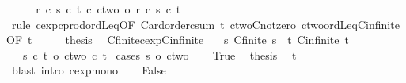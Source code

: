 \begin{isabellebody}
\ \ \isamarkupfalse%
\ \isamarkupfalse%
\ {\isachardoublequoteopen}{\isacharparenleft}{\kern0pt}{\isacharparenleft}{\kern0pt}r\ {\isacharplus}{\kern0pt}c\ s{\isacharparenright}{\kern0pt}\ {\isacharcircum}{\kern0pt}c\ t{\isacharparenright}{\kern0pt}\ {\isacharcircum}{\kern0pt}c\ ctwo\ {\isacharequal}{\kern0pt}o\ {\isacharparenleft}{\kern0pt}r\ {\isacharplus}{\kern0pt}c\ s{\isacharparenright}{\kern0pt}\ {\isacharcircum}{\kern0pt}c\ t{\isachardoublequoteclose}\isanewline
\ \ \ \ \isamarkupfalse%
\ {\isacharparenleft}{\kern0pt}rule\ cexp{\isacharunderscore}{\kern0pt}cprod{\isacharunderscore}{\kern0pt}ordLeq{\isacharbrackleft}{\kern0pt}OF\ Card{\isacharunderscore}{\kern0pt}order{\isacharunderscore}{\kern0pt}csum\ t\ ctwo{\isacharunderscore}{\kern0pt}Cnotzero\ ctwo{\isacharunderscore}{\kern0pt}ordLeq{\isacharunderscore}{\kern0pt}Cinfinite{\isacharbrackleft}{\kern0pt}OF\ t{\isacharbrackright}{\kern0pt}{\isacharbrackright}{\kern0pt}{\isacharparenright}{\kern0pt}\isanewline
\ \ \isamarkupfalse%
\ \isamarkupfalse%
\ {\isacharquery}{\kern0pt}thesis\ \isacommand{{\isachardot}{\kern0pt}}\isamarkupfalse%
\isanewline
{}\isamarkupfalse%
%
\endisatagproof
{\isafoldproof}%
%
\isadelimproof
\isanewline
%
\endisadelimproof
\isanewline
{}\isamarkupfalse%
\ Cfinite{\isacharunderscore}{\kern0pt}cexp{\isacharunderscore}{\kern0pt}Cinfinite{\isacharcolon}{\kern0pt}\isanewline
\ \ \ s{\isacharcolon}{\kern0pt}\ {\isachardoublequoteopen}Cfinite\ s{\isachardoublequoteclose}\ \ t{\isacharcolon}{\kern0pt}\ {\isachardoublequoteopen}Cinfinite\ t{\isachardoublequoteclose}\isanewline
\ \ \ {\isachardoublequoteopen}s\ {\isacharcircum}{\kern0pt}c\ t\ {\isasymle}o\ ctwo\ {\isacharcircum}{\kern0pt}c\ t{\isachardoublequoteclose}\isanewline
%
\isadelimproof
%
\endisadelimproof
%
\isatagproof
{}\isamarkupfalse%
\ {\isacharparenleft}{\kern0pt}cases\ {\isachardoublequoteopen}s\ {\isasymle}o\ ctwo{\isachardoublequoteclose}{\isacharparenright}{\kern0pt}\isanewline
\ \ \isamarkupfalse%
\ True\ \isamarkupfalse%
\ {\isacharquery}{\kern0pt}thesis\ \isamarkupfalse%
\ t\ \isamarkupfalse%
\ {\isacharparenleft}{\kern0pt}blast\ intro{\isacharcolon}{\kern0pt}\ cexp{\isacharunderscore}{\kern0pt}mono{}{\isacharparenright}{\kern0pt}\isanewline
{}\isamarkupfalse%
\isanewline
\ \ \isamarkupfalse%
\ False\isanewline
\ \ \isamarkupfalse%

\end{isabellebody}
